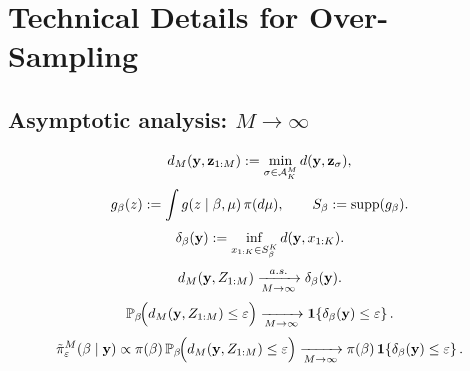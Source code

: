\section{Technical Details for Over-Sampling}
\label{appendix_os}

\subsection{Asymptotic analysis: \( M \to \infty \)}
\label{appendix_os_asymptotics}

\begin{equation}
    d_M(\mathbf{y},\mathbf{z}_{1:M})
    :=
    \min_{\sigma \in \mathcal{A}_K^M} d(\mathbf{y},\mathbf{z}_\sigma),
\end{equation}
\begin{equation}
    g_{\beta}(z)
    :=
    \int g(z \mid \beta,\mu)\,\pi(d\mu),
    \qquad
    S_{\beta}
    :=
    \operatorname{supp}(g_{\beta}).
\end{equation}
\begin{equation}
    \delta_{\beta}(\mathbf{y})
    :=
    \inf_{x_{1:K}\in S_{\beta}^K} d(\mathbf{y},x_{1:K}).
\end{equation}
\begin{equation}
    d_M(\mathbf{y},Z_{1:M})
    \xrightarrow[M\to\infty]{a.s.}
    \delta_{\beta}(\mathbf{y}).
\end{equation}
\begin{equation}
    \mathbb{P}_{\beta}\!\Bigl(
        d_M(\mathbf{y},Z_{1:M}) \le \varepsilon
    \Bigr)
    \xrightarrow[M\to\infty]{}
    \mathbf{1}\!\left\{
        \delta_{\beta}(\mathbf{y})\le \varepsilon
    \right\}.
\end{equation}
\begin{equation}
    \tilde{\pi}_\varepsilon^M(\beta \mid \mathbf{y})
    \propto
    \pi(\beta)\,
    \mathbb{P}_{\beta}\!\Bigl(
        d_M(\mathbf{y},Z_{1:M}) \le \varepsilon
    \Bigr)
    \xrightarrow[M\to\infty]{}
    \pi(\beta)\,
    \mathbf{1}\!\left\{
        \delta_{\beta}(\mathbf{y})\le \varepsilon
    \right\}.
\end{equation}
